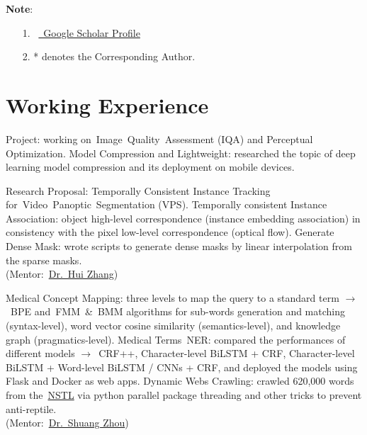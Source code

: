\documentclass{my_cv}
\begin{document}
\hspace*{\fill}

\noindent\textbf{Note}:
\begin{itemize}
	\item [1.]~\href{https://scholar.google.com/citations?user=PfpEP60AAAAJ&hl=en}{\aiGoogleScholar~Google Scholar Proﬁle}
	\item [2.] * denotes the Corresponding Author.
\end{itemize}

\hspace*{\fill}


\section{\textbf{Working Experience}}
\workitemstwo
{Project: working on~\textsc{I}mage~\textsc{Q}uality~\textsc{A}ssessment (\textsc{IQA}) and Perceptual Optimization.}
{Model Compression and Lightweight: researched the topic of deep learning model compression and its deployment on mobile devices.}

\workitemsthree
{Research Proposal: Temporally Consistent Instance Tracking for~\textsc{V}ideo~\textsc{P}anoptic~\textsc{S}egmentation (\textsc{VPS}).}
{Temporally consistent Instance Association: object high-level correspondence (instance embedding association) in consistency with the pixel low-level correspondence (optical flow).}
{Generate Dense Mask: wrote scripts to generate dense masks by linear interpolation from the sparse masks.\\(Mentor:~\href{mailto: hui123.zhang@samsung.com}{Dr.~Hui Zhang})}

\workitemsthree
{Medical Concept Mapping: three levels to map the query to a standard term $\rightarrow$~\textsc{BPE} and~\textsc{FMM}~\&~\textsc{BMM} algorithms for sub-words generation and matching (syntax-level), word vector cosine similarity (semantics-level), and knowledge graph (pragmatics-level).}
{Medical Terms~\textsc{NER}: compared the performances of different models $\rightarrow$~\textsc{CRF}++, Character-level BiLSTM + \textsc{CRF}, Character-level BiLSTM + Word-level BiLSTM / CNNs + \textsc{CRF}, and deployed the models using Flask and Docker as web apps.}
{Dynamic Webs Crawling: crawled 620,000 words from the~\href{https://www.nstl.gov.cn/stkos.html?t=Concept&q=}{\textsc{NSTL}} via python parallel package threading and other tricks to prevent anti-reptile.\\(Mentor:~\href{mailto: shuang.zhou@philips.com}{Dr.~Shuang Zhou})}
\end{document}
